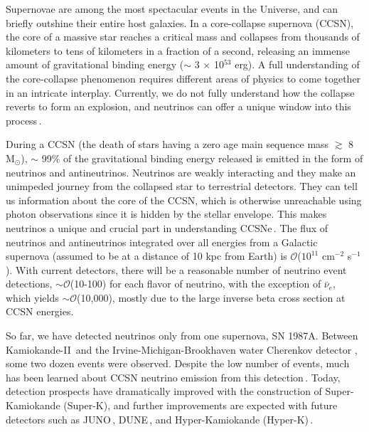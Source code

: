\documentclass[aps,reprint,superscriptaddress]{revtex4-1}
\begin{document}
Supernovae are among the most spectacular events in the Universe, and can briefly outshine their entire host galaxies.  In a core-collapse supernova (CCSN), the core of a massive star reaches a critical mass and collapses from thousands of kilometers to tens of kilometers in a fraction of a second, releasing an immense amount of gravitational binding energy ($\sim$ 3 $\times$ 10$^{53}$ erg).  A full understanding of the core-collapse phenomenon requires different areas of physics to come together in an intricate interplay.  Currently, we do not fully understand how the collapse reverts to form an explosion, and neutrinos can offer a unique window into this process\,\cite{Janka:2006fh,Woosley:2006ie,Burrows:2006ci,Mezzacappa:2005ju,Janka:2012wk}.  

During a CCSN (the death of stars having a zero age main sequence mass $\gtrsim$ 8 M$_\odot$), $\sim$ 99\% of the gravitational binding energy released is emitted in the form of neutrinos and antineutrinos.  Neutrinos are weakly interacting and they make an unimpeded journey from the collapsed star to terrestrial detectors.  They can tell us information about the core of the CCSN, which is otherwise unreachable using photon observations since it is hidden by the stellar envelope.  This makes neutrinos a unique and crucial part in understanding CCSNe\,\cite{Horiuchi:2008jz,Lund:2010kh,Scholberg:2012id,Kistler:2012as,Tamborra:2013laa,Cherry:2013mv,Tamborra:2014aua,Vissani:2014doa,Tamborra:2014hga,Patton:2014lza,Tian:2016hec,Horiuchi:2017sku,Wright:2017jwl,GalloRosso:2017hbp,Kneller:2017lqg,Horiuchi:2017qlw,Horiuchi:2017qja}.  The flux of neutrinos and antineutrinos integrated over all energies from a Galactic supernova (assumed to be at a distance of 10 kpc from Earth) is $\mathcal{O}$($10^{11}$ cm$^{-2}$ s$^{-1}$).  With current detectors, there will be a reasonable number of neutrino event detections, $\sim \mathcal{O}$(10-100) for each flavor of neutrino, with the exception of $\bar{\nu}_{e}$, which yields $\sim \mathcal{O}$(10,000), mostly due to the large inverse beta cross section at CCSN energies.  

So far, we have detected neutrinos only from one supernova, SN 1987A.  Between Kamiokande-II\,\cite{Hirata:1987hu} and the Irvine-Michigan-Brookhaven water Cherenkov detector \cite{PhysRevLett.58.1494}, some two dozen events were observed.  Despite the low number of events, much has been learned about CCSN neutrino emission from this detection\,\cite{PhysRevLett.58.1906,FRIEMAN1988115,kahana_1988,PhysRevLett.58.2722,Costantini:2004ry,Mirizzi:2005tg,Costantini:2006xd,Pagliaroli:2008ur,Ianni:2009bd,Vissani:2014doa}.  Today, detection prospects have dramatically improved with the construction of Super-Kamiokande (Super-K), and further improvements are expected with future detectors such as JUNO\,\cite{An:2015jdp}, DUNE\,\cite{Kudryavtsev:2016ybl,Acciarri:2016ooe}, and Hyper-Kamiokande (Hyper-K)\,\cite{Abe:2011ts,Hyper-Kamiokande:2016dsw}.
\end{document}
